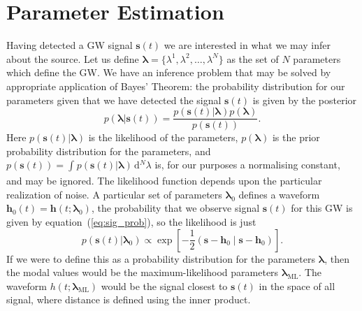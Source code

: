 \documentclass[a4paper, 11pt, titlepage, twoside]{report}
\newcommand{\eqnref}[1]{equation~(\ref{eq:#1})}
\newcommand{\sub}[1]{\ensuremath{_\mathrm{#1}}}
\newcommand{\recip}[1]{\ensuremath{\frac{1}{#1}}}
\newcommand{\innerprod}[2]{\ensuremath{\left({#1}\middle|{#2}\right)}}
\newcommand{\dd}{\ensuremath{\mathrm{d}}}
\newcommand{\intd}[4]{\ensuremath{\int_{#1}^{#2}{#3}\,\dd{#4}}}
\begin{document}
\section{Parameter Estimation}

Having detected a GW signal $\boldsymbol{s}(t)$ we are interested in what we may infer about the source. Let us define $\boldsymbol{\lambda} = \{\lambda^1, \lambda^2, \ldots, \lambda^N\}$ as the set of $N$ parameters which define the GW. We have an inference problem that may be solved by appropriate application of Bayes' Theorem\cite{Jaynes2003}: the probability distribution for our parameters given that we have detected the signal $\boldsymbol{s}(t)$ is given by the posterior
\begin{equation}
p(\boldsymbol{\lambda}|\boldsymbol{s}(t)) = \frac{p(\boldsymbol{s}(t)|\boldsymbol{\lambda})p(\boldsymbol{\lambda})}{p(\boldsymbol{s}(t))}.
\end{equation}
Here $p(\boldsymbol{s}(t)|\boldsymbol{\lambda})$ is the likelihood of the parameters, $p(\boldsymbol{\lambda})$ is the prior probability distribution for the parameters, and $p(\boldsymbol{s}(t)) = \intd{}{}{p(\boldsymbol{s}(t)|\boldsymbol{\lambda})}{^N \lambda}$ is, for our purposes a normalising constant, and may be ignored. The likelihood function depends upon the particular realization of noise. A particular set of parameters $\boldsymbol{\lambda}_0$ defines a waveform $\boldsymbol{h}_0(t) = \boldsymbol{h}(t; \boldsymbol{\lambda}_0)$, the probability that we observe signal $\boldsymbol{s}(t)$ for this GW is given by \eqnref{sig_prob}, so the likelihood is just
\begin{equation}
p(\boldsymbol{s}(t)|\boldsymbol{\lambda}_0) \propto \exp\left[-\recip{2}\innerprod{\boldsymbol{s}-\boldsymbol{h}_0}{\boldsymbol{s}-\boldsymbol{h}_0}\right].
\end{equation}
If we were to define this as a probability distribution for the parameters $\boldsymbol{\lambda}$, then the modal values would be the maximum-likelihood parameters $\boldsymbol{\lambda}\sub{ML}$. The waveform $h(t; \boldsymbol{\lambda}\sub{ML})$ would be the signal closest to $\boldsymbol{s}(t)$ in the space of all signal, where distance is defined using the inner product\cite{Cutler1994}.
\end{document}
